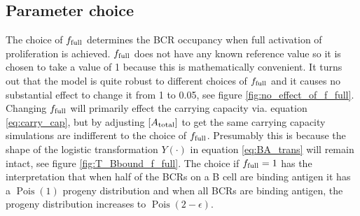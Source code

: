 \subsection{Parameter choice}
The choice of $f_{\text{full}}$ determines the BCR occupancy when full activation of proliferation is achieved.
$f_{\text{full}}$ does not have any known reference value so it is chosen to take a value of 1 because this is mathematically convenient.
It turns out that the model is quite robust to different choices of $f_{\text{full}}$ and it causes no substantial effect to change it from 1 to 0.05, see figure \ref{fig:no_effect_of_f_full}.
Changing $f_{\text{full}}$ will primarily effect the carrying capacity via. equation \ref{eq:carry_cap}, but by adjusting $[A_{\text{total}}]$ to get the same carrying capacity simulations are indifferent to the choice of $f_{\text{full}}$.
Presumably this is because the shape of the logistic transformation $Y(\cdot)$ in equation \ref{eq:BA_trans} will remain intact, see figure \ref{fig:T_Bbound_f_full}.
The choice if $f_{\text{full}} = 1$ has the interpretation that when half of the BCRs on a B cell are binding antigen it has a $\operatorname{Pois}(1)$ progeny distribution and when all BCRs are binding antigen, the progeny distribution increases to $\operatorname{Pois}(2-\epsilon)$.

